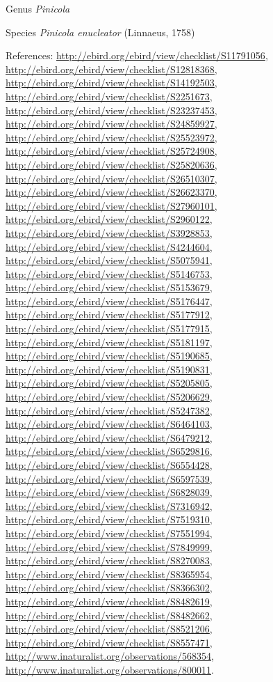 \documentclass[9pt, article]{memoir}
\begin{document}
\begin{multicols}{2}
\vspace{6pt}\noindent\hspace{30pt}Genus \textit{Pinicola}


\vspace{6pt}\noindent\hspace{36pt}Species \textit{Pinicola enucleator} (Linnaeus, 1758)


\vspace{6pt}References: 
\url{http://ebird.org/ebird/view/checklist/S11791056}, 
\url{http://ebird.org/ebird/view/checklist/S12818368}, 
\url{http://ebird.org/ebird/view/checklist/S14192503}, 
\url{http://ebird.org/ebird/view/checklist/S2251673}, 
\url{http://ebird.org/ebird/view/checklist/S23237453}, 
\url{http://ebird.org/ebird/view/checklist/S24859927}, 
\url{http://ebird.org/ebird/view/checklist/S25523972}, 
\url{http://ebird.org/ebird/view/checklist/S25724908}, 
\url{http://ebird.org/ebird/view/checklist/S25820636}, 
\url{http://ebird.org/ebird/view/checklist/S26510307}, 
\url{http://ebird.org/ebird/view/checklist/S26623370}, 
\url{http://ebird.org/ebird/view/checklist/S27960101}, 
\url{http://ebird.org/ebird/view/checklist/S2960122}, 
\url{http://ebird.org/ebird/view/checklist/S3928853}, 
\url{http://ebird.org/ebird/view/checklist/S4244604}, 
\url{http://ebird.org/ebird/view/checklist/S5075941}, 
\url{http://ebird.org/ebird/view/checklist/S5146753}, 
\url{http://ebird.org/ebird/view/checklist/S5153679}, 
\url{http://ebird.org/ebird/view/checklist/S5176447}, 
\url{http://ebird.org/ebird/view/checklist/S5177912}, 
\url{http://ebird.org/ebird/view/checklist/S5177915}, 
\url{http://ebird.org/ebird/view/checklist/S5181197}, 
\url{http://ebird.org/ebird/view/checklist/S5190685}, 
\url{http://ebird.org/ebird/view/checklist/S5190831}, 
\url{http://ebird.org/ebird/view/checklist/S5205805}, 
\url{http://ebird.org/ebird/view/checklist/S5206629}, 
\url{http://ebird.org/ebird/view/checklist/S5247382}, 
\url{http://ebird.org/ebird/view/checklist/S6464103}, 
\url{http://ebird.org/ebird/view/checklist/S6479212}, 
\url{http://ebird.org/ebird/view/checklist/S6529816}, 
\url{http://ebird.org/ebird/view/checklist/S6554428}, 
\url{http://ebird.org/ebird/view/checklist/S6597539}, 
\url{http://ebird.org/ebird/view/checklist/S6828039}, 
\url{http://ebird.org/ebird/view/checklist/S7316942}, 
\url{http://ebird.org/ebird/view/checklist/S7519310}, 
\url{http://ebird.org/ebird/view/checklist/S7551994}, 
\url{http://ebird.org/ebird/view/checklist/S7849999}, 
\url{http://ebird.org/ebird/view/checklist/S8270083}, 
\url{http://ebird.org/ebird/view/checklist/S8365954}, 
\url{http://ebird.org/ebird/view/checklist/S8366302}, 
\url{http://ebird.org/ebird/view/checklist/S8482619}, 
\url{http://ebird.org/ebird/view/checklist/S8482662}, 
\url{http://ebird.org/ebird/view/checklist/S8521206}, 
\url{http://ebird.org/ebird/view/checklist/S8557471}, 
\url{http://www.inaturalist.org/observations/568354}, 
\url{http://www.inaturalist.org/observations/800011}.


\end{multicols}
\end{document}

